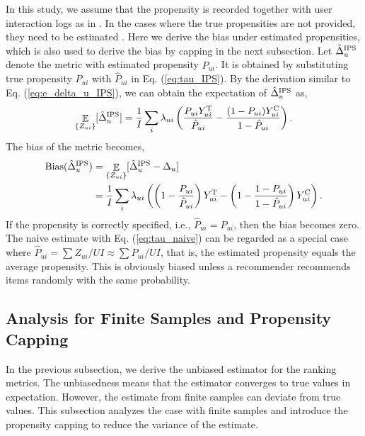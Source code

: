 \documentclass[manuscript,screen]{acmart}
\DeclareMathOperator{\E}{\mathbb{E}}
\begin{document}
In this study, we assume that the propensity is recorded together with user interaction logs as in \cite{Lefortier16}.
In the cases where the true propensities are not provided, they need to be estimated \cite{Hirano03}.
Here we derive the bias under estimated propensities, which is also used to derive the bias by capping in the next subsection.
Let $\hat{\Delta}_{u}^{\textnormal{IPS}}$ denote the metric with estimated propensity $\hat{P}_{ui}$.
It is obtained by substituting true propensity $P_{ui}$ with $\hat{P}_{ui}$ in Eq. (\ref{eq:tau_IPS}).
By the derivation similar to Eq. (\ref{eq:e_delta_u_IPS}), we can obtain the expectation of $\hat{\Delta}_{u}^{\textnormal{IPS}}$ as,
\begin{equation}
\E_{\{Z_{ui}\}} [\hat{\Delta}_{u}^{\textnormal{IPS}}]
= \frac{1}{I} \sum_i \lambda_{ui} \left(\frac{P_{ui} Y_{ui}^\textnormal{T}}{\hat{P}_{ui}} - \frac{(1-P_{ui}) Y_{ui}^\textnormal{C}}{1-\hat{P}_{ui}} \right).
\end{equation}
The bias of the metric becomes,
\begin{align} 
\textnormal{Bias}(\hat{\Delta}_{u}^{\textnormal{IPS}})
&= \E_{\{Z_{ui}\}} [\hat{\Delta}_{u}^{\textnormal{IPS}} - \Delta_{u}] \nonumber\\ 
&= \frac{1}{I} \sum_i \lambda_{ui}  \left(\left(1 - \frac{P_{ui}}{\hat{P}_{ui}} \right)Y_{ui}^\textnormal{T} - \left(1 - \frac{1-P_{ui}}{1-\hat{P}_{ui}} \right)Y_{ui}^\textnormal{C} \right).
\label{eq:bias_estimated_propensity}
\end{align}
If the propensity is correctly specified, i.e., $\hat{P}_{ui} = P_{ui}$, then the bias becomes zero.
The naive estimate with Eq. (\ref{eq:tau_naive}) can be regarded as a special case where $\hat{P}_{ui}=\sum Z_{ui}/UI \approx \sum P_{ui}/UI$, that is, the estimated propensity equals the average propensity.
This is obviously biased unless a recommender recommends items randomly with the same probability.

\subsection{Analysis for Finite Samples and Propensity Capping}
\label{subsec:finite_analysis}
In the previous subsection, we derive the unbiased estimator for the ranking metrics.
The unbiasedness means that the estimator converges to true values in expectation.
However, the estimate from finite samples can deviate from true values.
This subsection analyzes the case with finite samples and introduce the propensity capping to reduce the variance of the estimate.
\end{document}
